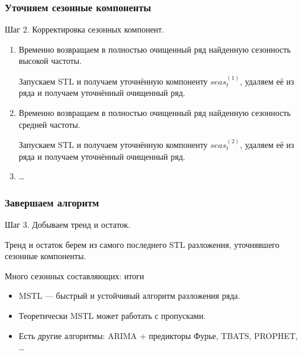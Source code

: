 \begin{frame}
  \frametitle{Уточняем сезонные компоненты}

  Шаг 2. Корректировка сезонных компонент. 

  \begin{enumerate}[<+->]
    \item Временно \alert{возвращаем} в полностью очищенный ряд найденную \alert{сезонность} высокой частоты.
    
    Запускаем STL и получаем \alert{уточнённую компоненту} $seas_t^{(1)}$, удаляем её из ряда и получаем \alert{уточнённый очищенный ряд}. 

    \item Временно \alert{возвращаем} в полностью очищенный ряд найденную \alert{сезонность} средней частоты.
    
    Запускаем STL и получаем \alert{уточнённую компоненту} $seas_t^{(2)}$, удаляем её из ряда и получаем \alert{уточнённый очищенный ряд}. 

    \item \ldots

  \end{enumerate}

\end{frame}



\begin{frame}
  \frametitle{Завершаем алгоритм}

  Шаг 3. Добываем тренд и остаток. 

  \alert{Тренд} и \alert{остаток} берем из самого \alert{последнего} STL разложения, уточнявшего сезонные компоненты. 
  
\end{frame}


\begin{frame}{Много сезонных составляющих: итоги}

  \begin{itemize}[<+->]
    \item \alert{MSTL} — быстрый и устойчивый алгоритм разложения ряда.
    \item Теоретически \alert{MSTL} может работать с пропусками.
    \item Есть другие алгоритмы: ARIMA + предикторы Фурье, TBATS, PROPHET, \ldots
  \end{itemize}
\end{frame}


